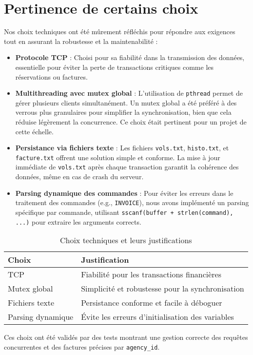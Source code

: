 \documentclass[a4paper,12pt]{article}
\begin{document}
\section{Pertinence de certains choix}
Nos choix techniques ont été mûrement réfléchis pour répondre aux exigences tout en assurant la robustesse et la maintenabilité :
\begin{itemize}
    \item \textbf{Protocole TCP} : Choisi pour sa fiabilité dans la transmission des données, essentielle pour éviter la perte de transactions critiques comme les réservations ou factures.
    \item \textbf{Multithreading avec mutex global} : L’utilisation de \texttt{pthread} permet de gérer plusieurs clients simultanément. Un mutex global a été préféré à des verrous plus granulaires pour simplifier la synchronisation, bien que cela réduise légèrement la concurrence. Ce choix était pertinent pour un projet de cette échelle.
    \item \textbf{Persistance via fichiers texte} : Les fichiers \texttt{vols.txt}, \texttt{histo.txt}, et \texttt{facture.txt} offrent une solution simple et conforme. La mise à jour immédiate de \texttt{vols.txt} après chaque transaction garantit la cohérence des données, même en cas de crash du serveur.
    \item \textbf{Parsing dynamique des commandes} : Pour éviter les erreurs dans le traitement des commandes (e.g., \texttt{INVOICE}), nous avons implémenté un parsing spécifique par commande, utilisant \texttt{sscanf(buffer + strlen(command), ...)} pour extraire les arguments corrects.
\end{itemize}
\begin{table}[h]
\centering
\caption{Choix techniques et leurs justifications}
\begin{tabular}{l p{8cm}}
\toprule
\textbf{Choix} & \textbf{Justification} \\
\midrule
TCP & Fiabilité pour les transactions financières \\
Mutex global & Simplicité et robustesse pour la synchronisation \\
Fichiers texte & Persistance conforme et facile à déboguer \\
Parsing dynamique & Évite les erreurs d’initialisation des variables \\
\bottomrule
\end{tabular}
\end{table}
Ces choix ont été validés par des tests montrant une gestion correcte des requêtes concurrentes et des factures précises par \texttt{agency_id}.
\end{document}
